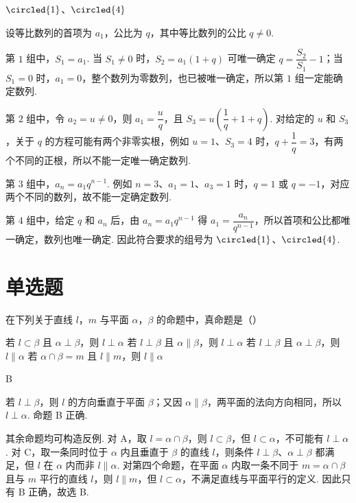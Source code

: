 \begin{answer}
\(\circled{1}\)、\(\circled{4}\)
\end{answer}

\begin{solution}
设等比数列的首项为 \(a_{1}\)，公比为 \(q\)，其中等比数列的公比 \(q\ne0\).

第 \(1\) 组中，\(S_{1}=a_{1}\). 当 \(S_{1}\ne0\) 时，\(S_{2}=a_{1}(1+q)\) 可唯一确定 \(q=\dfrac{S_{2}}{S_{1}}-1\)；当 \(S_{1}=0\) 时，\(a_{1}=0\)，整个数列为零数列，也已被唯一确定，所以第 \(1\) 组一定能确定数列.

第 \(2\) 组中，令 \(a_{2}=u\ne0\)，则 \(a_{1}=\dfrac{u}{q}\)，且 \(S_{3}=u\left(\dfrac1q+1+q\right)\). 对给定的 \(u\) 和 \(S_{3}\)，关于 \(q\) 的方程可能有两个非零实根，例如 \(u=1\)、\(S_{3}=4\) 时，\(q+\dfrac1q=3\)，有两个不同的正根，所以不能一定唯一确定数列.

第 \(3\) 组中，\(a_{n}=a_{1}q^{n-1}\). 例如 \(n=3\)、\(a_{1}=1\)、\(a_{3}=1\) 时，\(q=1\) 或 \(q=-1\)，对应两个不同的数列，故不能一定确定数列.

第 \(4\) 组中，给定 \(q\) 和 \(a_{n}\) 后，由 \(a_{n}=a_{1}q^{n-1}\) 得 \(a_{1}=\dfrac{a_{n}}{q^{n-1}}\)，所以首项和公比都唯一确定，数列也唯一确定. 因此符合要求的组号为 \(\circled{1}\)、\(\circled{4}\).
\end{solution}

\section{单选题}
\begin{problem}
在下列关于直线 \(l\)，\(m\) 与平面 \(\alpha\)，\(\beta\) 的命题中，真命题是（\quad）

\choices
    {若 \(l \subset \beta\) 且 \(\alpha \perp \beta\)，则 \(l \perp \alpha\)}
    {若 \(l \perp \beta\) 且 \(\alpha \parallel \beta\)，则 \(l \perp \alpha\)}
    {若 \(l \perp \beta\) 且 \(\alpha \perp \beta\)，则 \(l \parallel \alpha\)}
    {若 \(\alpha \cap \beta = m\) 且 \(l \parallel m\)，则 \(l \parallel \alpha\)}
\end{problem}

\begin{answer}
B
\end{answer}

\begin{solution}
若 \(l\perp\beta\)，则 \(l\) 的方向垂直于平面 \(\beta\)；又因 \(\alpha\parallel\beta\)，两平面的法向方向相同，所以 \(l\perp\alpha\). 命题 B 正确.

其余命题均可构造反例. 对 A，取 \(l=\alpha\cap\beta\)，则 \(l\subset\beta\)，但 \(l\subset\alpha\)，不可能有 \(l\perp\alpha\). 对 C，取一条同时位于 \(\alpha\) 内且垂直于 \(\beta\) 的直线 \(l\)，则条件 \(l\perp\beta\)、\(\alpha\perp\beta\) 都满足，但 \(l\) 在 \(\alpha\) 内而非 \(l\parallel\alpha\). 对第四个命题，在平面 \(\alpha\) 内取一条不同于 \(m=\alpha\cap\beta\) 且与 \(m\) 平行的直线 \(l\)，则 \(l\parallel m\)，但 \(l\subset\alpha\)，不满足直线与平面平行的定义. 因此只有 B 正确，故选 B.
\end{solution}

